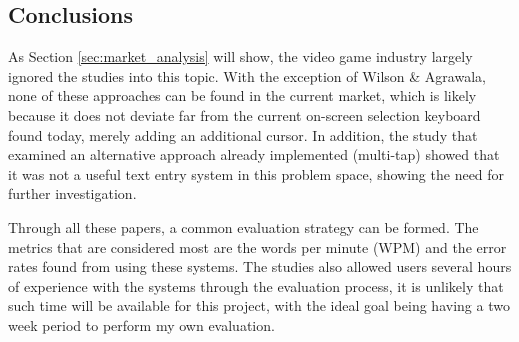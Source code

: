 \documentclass[requirements.tex]{subfiles}
\begin{document}
\subsection{Conclusions} %
\label{sub:conclusions}
As Section \ref{sec:market_analysis} will show, the video game industry largely
ignored the studies into this topic. With the exception of Wilson \& Agrawala,
none of these approaches can be found in the current market, which is likely
because it does not deviate far from the current on-screen selection keyboard
found today, merely adding an additional cursor. In addition, the study that
examined an alternative approach already implemented (multi-tap) showed that it
was not a useful text entry system in this problem space, showing the need for
further investigation.

Through all these papers, a common evaluation strategy can be formed. The
metrics that are considered most are the words per minute (WPM) and the error
rates found from using these systems. The studies also allowed users several
hours of experience with the systems through the evaluation process, it is
unlikely that such time will be available for this project, with the ideal goal
being having a two week period to perform my own evaluation.
\end{document}
